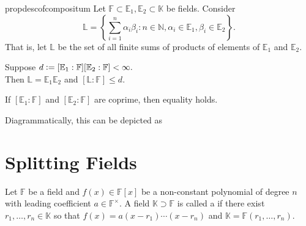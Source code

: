 \begin{restatable}[]{prop}{descofcompositum}
\label{prop:descofcompositum}
    Let $\mathbb{F} \subset \mathbb{E}_1, \mathbb{E}_2 \subset \mathbb{K}$ be fields. Consider
    \begin{equation*} 
        \mathbb{L} = \left\{\sum_{i = 1}^{n} \alpha_i\beta_i : n \in \mathbb{N}, \alpha_i \in \mathbb{E}_1, \beta_i \in \mathbb{E}_2\right\}.
    \end{equation*}
    That is, let $\mathbb{L}$ be the set of all finite sums of products of elements of $\mathbb{E}_1$ and $\mathbb{E}_2.$

    Suppose $d \vcentcolon= [\mathbb{E}_1 : \mathbb{F}][\mathbb{E}_2 : \mathbb{F}] < \infty.$ \\
    Then $\mathbb{L} = \mathbb{E}_1\mathbb{E}_2$ and $[\mathbb{L} : \mathbb{F}] \le d.$ 

     If $[\mathbb{E}_1 : \mathbb{F}]$ and $[\mathbb{E}_2 : \mathbb{F}]$ are coprime, then equality holds. \hfill\hyperref[prop:descofcompositum2]{\downsym}
\end{restatable}

Diagrammatically, this can be depicted as
\begin{center}
\end{center}

\section{Splitting Fields}

\begin{defn}%
    Let $\mathbb{F}$ be a field and $f(x) \in \mathbb{F}[x]$ be a non-constant polynomial of degree $n$ with leading coefficient $a \in \mathbb{F}^\times.$ A field $\mathbb{K} \supset \mathbb{F}$ is called a  if there exist $r_1, \ldots, r_n \in \mathbb{K}$ so that $f(x) = a(x - r_1)\cdots(x - r_n)$ and $\mathbb{K} = \mathbb{F}(r_1, \ldots, r_n).$
\end{defn}

